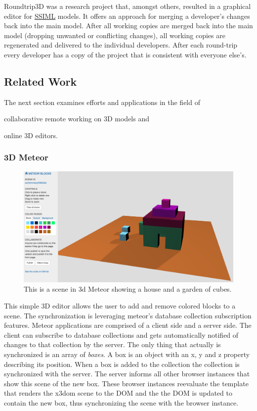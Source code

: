 Roundtrip3D was a research project that, amongst others, resulted in a
graphical editor for \hyperref[ssiml]{SSIML} models. It offers an
approach for merging a developer's changes back into the main model.
After all working copies are merged back into the main model (dropping
unwanted or conflicting changes), all working copies are regenerated and
delivered to the individual developers. After each round-trip every
developer has a copy of the project that is consistent with everyone
else's.

\subsection{Related Work}
\label{related-work}

The next section examines efforts and applications in the field of

\begin{itemize*}
  \item collaborative remote working on \gls{3D} models and
  \item online \gls{3D} editors.
\end{itemize*}

\subsubsection{3D Meteor}
\label{d-meteor0}

\begin{figure}[htbp]
  \centering
  \includegraphics[width=12cm]{../assets/3dmeteor.png}
  \caption{This is a scene in 3d Meteor showing a house and a garden of cubes.}
	\label{fig:3dmeteor}
\end{figure}

This simple \gls{3D} editor allows the user to add and remove colored blocks to a
scene. The synchronization is leveraging meteor's database collection
subscription features. Meteor applications are comprised of a client side and a
server side. The client can subscribe to database collections and gets
automatically notified of changes to that collection by the server. The only
thing that actually is synchronized is an array of \emph{boxes}. A box is an
object with an x, y and z property describing its position. When a box is
added to the collection the collection is synchronized with the server. The
server informs all other browser instances that show this scene of the new box.
These browser instances reevaluate the template that renders the x3dom scene to
the \gls{DOM} and the the \gls{DOM} is updated to contain the new box, thus synchronizing
the scene with the browser instance. \cite{3dmeteor}

